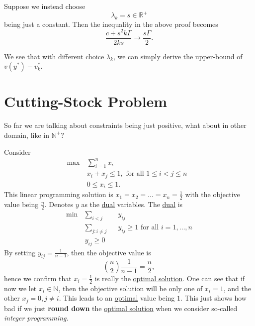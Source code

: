 \begin{remark}
	Suppose we instead choose
	\[
		\lambda_{k} = s\in\mathbb{R}^+
	\]
	being just a constant. Then the inequality in the above proof becomes
	\[
		\frac{c + s^2 k \Gamma }{2 k s}\to \frac{s \Gamma}{2}.
	\]

	We see that with different choice \(\lambda_{k}\), we can simply derive the upper-bound of \(v(y^{\ast}) - v^{\ast}_{k}\).
\end{remark}

\section{Cutting-Stock Problem}
So far we are talking about constraints being just positive, what about in other domain, like in \(\mathbb{N}^+\)?

Consider
\[
	\begin{aligned}
		\max~ & \sum\limits_{i=1}^{n} x_{i}                              \\
		      & x_{i}+x_{j}\leq 1, \text{ for all \(1\leq i< j\leq n\) } \\
		      & 0\leq x_{i}\leq 1.
	\end{aligned}
\]
This linear programming solution is \(x_1 = x_2 = \dots  = x_n = \frac{1}{2}\) with the objective value being \(\frac{n}{2}\). Denotes \(y\) as the \hyperref[def:dual]{dual} variables. The \hyperref[def:dual]{dual} is
\[
	\begin{alignedat}{3}
		\min~ & \sum\limits_{i<j}            && y_{ij}                                             \\
		& \sum\limits_{j\colon i\neq j} && y_{ij}\geq 1 \text{ for all \(i = 1, \dots , n\)} \\
		& y_{ij}\geq 0
	\end{alignedat}
\]
By setting \(y_{ij} = \frac{1}{n-1}\), then the objective value is
\[
	\binom{n}{2}\frac{1}{n-1} = \frac{n}{2},
\]
hence we confirm that \(x_{i} = \frac{1}{2}\) is really the \hyperref[def:optimal-solution]{optimal solution}. One can see that if now we let \(x_{i}\in\mathbb{N}\), then the objective solution will be only one of \(x_{i} = 1\), and the other \(x_{j} = 0, j\neq i\). This leads to an \hyperref[def:optimal-solution]{optimal} value being \(1\). This just shows how bad if we just \textbf{round down} the \hyperref[def:optimal-solution]{optimal solution} when we consider so-called \emph{integer programming}.